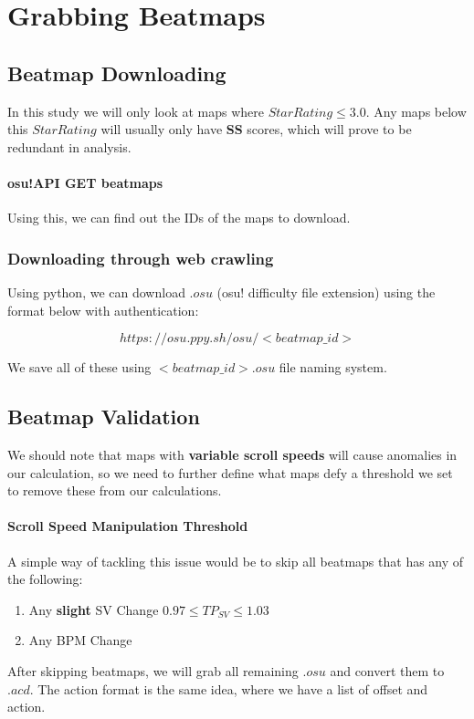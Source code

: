 

\section{Grabbing Beatmaps}

\subsection{Beatmap Downloading}

In this study we will only look at maps where $ Star Rating \leq 3.0 $. Any maps below this $Star Rating$ will usually only have \textbf{SS} scores, which will prove to be redundant in analysis.

\paragraph{osu!API GET beatmaps} Using this, we can find out the IDs of the maps to download.

\subsubsection{Downloading through web crawling}

Using python, we can download $.osu$ (osu! difficulty file extension) using the format below with authentication:

$$https://osu.ppy.sh/osu/<beatmap\_id>$$

We save all of these using $<beatmap\_id>.osu$ file naming system.

\subsection{Beatmap Validation}

We should note that maps with \textbf{variable scroll speeds} will cause anomalies in our calculation, so we need to further define what maps defy a threshold we set to remove these from our calculations.

\paragraph{Scroll Speed Manipulation Threshold}
A simple way of tackling this issue would be to skip all beatmaps that has any of the following:
\begin{enumerate}
	\item Any \textbf{slight} SV Change $ 0.97 \leq TP_{SV} \leq 1.03 $
	\item Any BPM Change
\end{enumerate}

After skipping beatmaps, we will grab all remaining $.osu$ and convert them to $.acd$. The action format is the same idea, where we have a list of offset and action.


